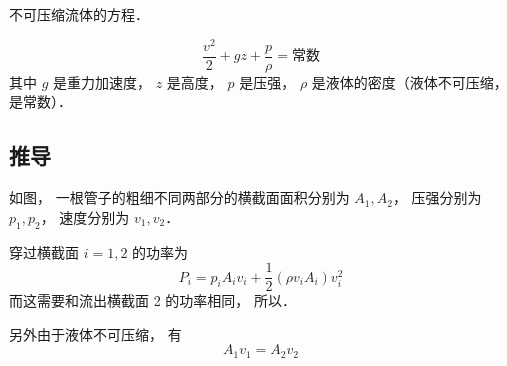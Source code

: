 
\begin{issues}
\issueDraft
\end{issues}

不可压缩流体的方程．

\begin{equation}
\frac{v^2}{2} + gz + \frac{p}{\rho} = \text{常数}
\end{equation}
其中 $g$ 是重力加速度， $z$ 是高度， $p$ 是压强， $\rho$ 是液体的密度（液体不可压缩， 是常数）．

\subsection{推导}
如图， 一根管子的粗细不同两部分的横截面面积分别为 $A_1, A_2$， 压强分别为 $p_1, p_2$， 速度分别为 $v_1, v_2$．

穿过横截面 $i = 1, 2$ 的功率为
\begin{equation}
P_i = p_i A_i v_i + \frac{1}{2} (\rho v_i A_i) v_i^2
\end{equation}
而这需要和流出横截面 2 的功率相同， 所以．

另外由于液体不可压缩， 有
\begin{equation}
A_1v_1 = A_2 v_2
\end{equation}


